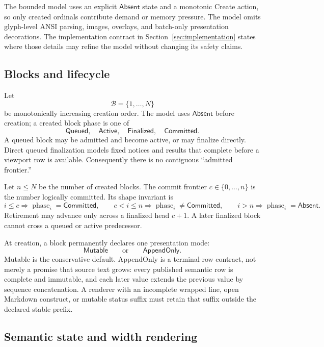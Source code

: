 \documentclass[11pt]{article}
\theoremstyle{definition}
\newcommand{\Blocks}{\mathcal{B}}
\newcommand{\Active}{\mathsf{Active}}
\newcommand{\Finalized}{\mathsf{Finalized}}
\newcommand{\Committed}{\mathsf{Committed}}
\newcommand{\Queued}{\mathsf{Queued}}
\begin{document}
The bounded model uses an explicit $\mathsf{Absent}$ state and a monotonic
Create action, so only created ordinals contribute demand or memory pressure.
The model omits glyph-level ANSI parsing,
images, overlays, and batch-only presentation decorations.  The implementation
contract in Section~\ref{sec:implementation} states where those details may
refine the model without changing its safety claims.

\subsection{Blocks and lifecycle}

Let
\[
  \Blocks=\{1,\ldots,N\}
\]
be monotonically increasing creation order.  The model uses
$\mathsf{Absent}$ before creation; a created block phase is one of
\[
  \Queued,\quad \Active,\quad \Finalized,\quad \Committed.
\]
A queued block may be admitted and become active, or may finalize directly.
Direct queued finalization models fixed notices and results that complete
before a viewport row is available.  Consequently there is no contiguous
``admitted frontier.''

Let $n\leq N$ be the number of created blocks.  The commit frontier
$c\in\{0,\ldots,n\}$ is the number logically committed.  Its shape invariant is
\begin{equation}
  i\leq c\Rightarrow\operatorname{phase}_i=\Committed,
  \qquad
  c<i\leq n\Rightarrow\operatorname{phase}_i\neq\Committed,
  \qquad
  i>n\Rightarrow\operatorname{phase}_i=\mathsf{Absent}.
  \label{eq:lifecycle-shape}
\end{equation}
Retirement may advance only across a finalized head $c+1$.  A later finalized
block cannot cross a queued or active predecessor.

At creation, a block permanently declares one presentation mode:
\[
  \mathsf{Mutable}\qquad\text{or}\qquad\mathsf{AppendOnly}.
\]
Mutable is the conservative default.  AppendOnly is a terminal-row contract,
not merely a promise that source text grows: every published semantic row is
complete and immutable, and each later value extends the previous value by
sequence concatenation.  A renderer with an incomplete wrapped line, open
Markdown construct, or mutable status suffix must retain that suffix outside
the declared stable prefix.

\subsection{Semantic state and width rendering}
\end{document}
